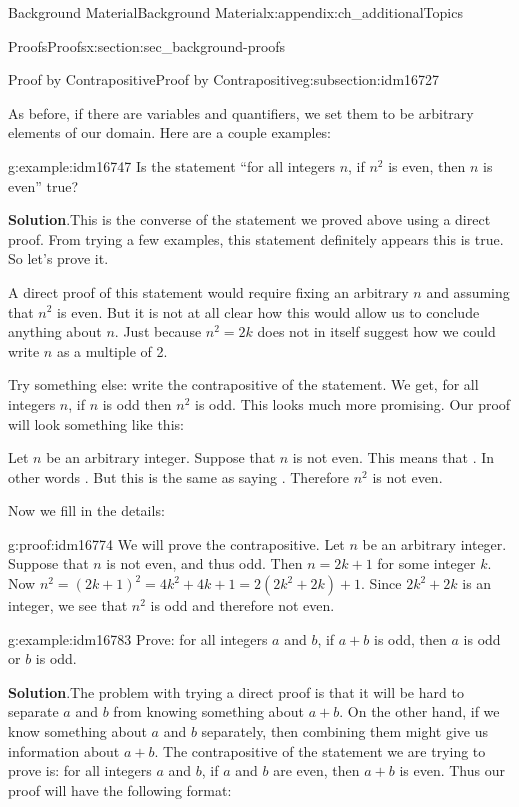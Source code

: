 \documentclass[oneside,10pt,]{book}
\numberwithin{equation}{chapter}
\begin{document}
\begin{appendixptx}{Background Material}{}{Background Material}{}{}{x:appendix:ch_additionalTopics}
\begin{sectionptx}{Proofs}{}{Proofs}{}{}{x:section:sec_background-proofs}
\begin{subsectionptx}{Proof by Contrapositive}{}{Proof by Contrapositive}{}{}{g:subsection:idm16727}
\begin{quote}
\end{quote}
As before, if there are variables and quantifiers, we set them to be arbitrary elements of our domain. Here are a couple examples:%
\begin{example}{}{g:example:idm16747}%
Is the statement ``for all integers \(n\), if \(n^2\) is even, then \(n\) is even'' true?%
\par\smallskip%
\noindent\textbf{Solution}.\hypertarget{g:solution:idm16754}{}\quad{}This is the converse of the statement we proved above using a direct proof. From trying a few examples, this statement definitely appears this is true. So let's prove it.%
\par
A direct proof of this statement would require fixing an arbitrary \(n\) and assuming that \(n^2\) is even. But it is not at all clear how this would allow us to conclude anything about \(n\). Just because \(n^2 = 2k\) does not in itself suggest how we could write \(n\) as a multiple of 2.%
\par
Try something else: write the contrapositive of the statement. We get, for all integers \(n\), if \(n\) is odd then \(n^2\) is odd. This looks much more promising. Our proof will look something like this:%
\par
Let \(n\) be an arbitrary integer. Suppose that \(n\) is not even. This means that \textellipsis{}. In other words \textellipsis{}. But this is the same as saying \textellipsis{}. Therefore \(n^2\) is not even.%
\par
Now we fill in the details:%
\begin{proofptx}{}{g:proof:idm16774}
We will prove the contrapositive. Let \(n\) be an arbitrary integer. Suppose that \(n\) is not even, and thus odd. Then \(n= 2k+1\) for some integer \(k\). Now \(n^2 = (2k+1)^2 = 4k^2 + 4k + 1 = 2(2k^2 + 2k) + 1\). Since \(2k^2 + 2k\) is an integer, we see that \(n^2\) is odd and therefore not even.%
\end{proofptx}
\end{example}
\begin{example}{}{g:example:idm16783}%
Prove: for all integers \(a\) and \(b\), if \(a + b\) is odd, then \(a\) is odd or \(b\) is odd.%
\par\smallskip%
\noindent\textbf{Solution}.\hypertarget{g:solution:idm16791}{}\quad{}The problem with trying a direct proof is that it will be hard to separate \(a\) and \(b\) from knowing something about \(a+b\). On the other hand, if we know something about \(a\) and \(b\) separately, then combining them might give us information about \(a+b\). The contrapositive of the statement we are trying to prove is: for all integers \(a\) and \(b\), if \(a\) and \(b\) are even, then \(a+b\) is even. Thus our proof will have the following format:%

\end{example}
\end{subsectionptx}
\end{sectionptx}
\end{appendixptx}
\end{document}

